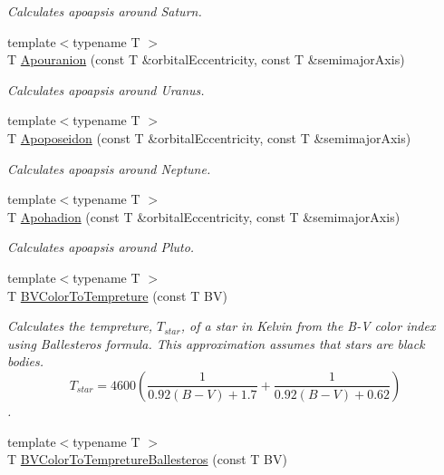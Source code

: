 \begin{DoxyCompactItemize}
\begin{DoxyCompactList}\small\item\em Calculates apoapsis around Saturn. \end{DoxyCompactList}\item 
{\footnotesize template$<$typename T $>$ }\\T \mbox{\hyperlink{group___e_g_x_phys-_apoapsis_ga6efaf5c9379f1085fa6e51bf97356124}{Apouranion}} (const T \&orbital\+Eccentricity, const T \&semimajor\+Axis)
\begin{DoxyCompactList}\small\item\em Calculates apoapsis around Uranus. \end{DoxyCompactList}\item 
{\footnotesize template$<$typename T $>$ }\\T \mbox{\hyperlink{group___e_g_x_phys-_apoapsis_ga89679654fff13176e989536163a27f9d}{Apoposeidon}} (const T \&orbital\+Eccentricity, const T \&semimajor\+Axis)
\begin{DoxyCompactList}\small\item\em Calculates apoapsis around Neptune. \end{DoxyCompactList}\item 
{\footnotesize template$<$typename T $>$ }\\T \mbox{\hyperlink{group___e_g_x_phys-_apoapsis_gaa16847ddc5763c327067075dcb6a3353}{Apohadion}} (const T \&orbital\+Eccentricity, const T \&semimajor\+Axis)
\begin{DoxyCompactList}\small\item\em Calculates apoapsis around Pluto. \end{DoxyCompactList}\item 
{\footnotesize template$<$typename T $>$ }\\T \mbox{\hyperlink{group___e_g_x_phys-_astrophysic-_b-_v_color_gad251a8c25285f5817e307c35c3ec971a}{B\+V\+Color\+To\+Tempreture}} (const T BV)
\begin{DoxyCompactList}\small\item\em Calculates the tempreture, $T_{star}$, of a star in Kelvin from the B-\/V color index using Ballesteros\textquotesingle{} formula. This approximation assumes that stars are black bodies. \[T_{star}=4600 \left ( \frac{1}{0.92 (B-V)+ 1.7} + \frac{1}{0.92 (B-V) + 0.62} \right )\]. \end{DoxyCompactList}\item 
{\footnotesize template$<$typename T $>$ }\\T \mbox{\hyperlink{group___e_g_x_phys-_astrophysic-_b-_v_color_ga0e553143a3bb121c3ae50ca96c502140}{B\+V\+Color\+To\+Tempreture\+Ballesteros}} (const T BV)

\end{DoxyCompactItemize}
